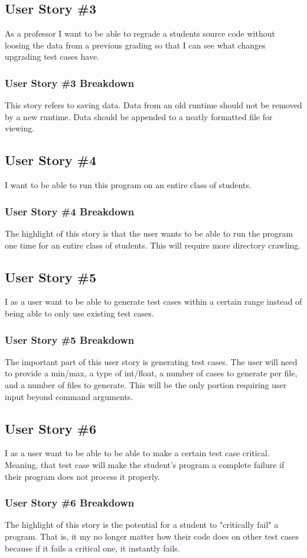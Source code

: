\subsection{User Story \#3} 

As a professor I want to be able to regrade a students source code without loosing the data from a previous
grading so that I can see what changes upgrading test cases have.

\subsubsection{User Story \#3 Breakdown}
This story refers to saving data. Data from an old runtime should not be removed by a new runtime. Data should be appended to a neatly formatted file for viewing.

\subsection{User Story \#4}
I want to be able to run this program on an entire class of students.

\subsubsection{User Story \#4 Breakdown}
The highlight of this story is that the user wants to be able to run the program one time for an entire class of students. This will require more directory crawling.

\subsection{User Story \#5}
I as a user want to be able to generate test cases within a certain range instead of being able to only use existing test cases.

\subsubsection{User Story \#5 Breakdown}
The important part of this user story is generating test cases. The user will need to provide a min/max, a type of int/float, a number of cases to generate per file, and a number of files to generate. This will be the only portion requiring user input beyond command arguments.

\subsection{User Story \#6}
I as a user want to be able to be able to make a certain test case critical. Meaning, that test case will make the student's program a complete failure if their program does not process it properly.

\subsubsection{User Story \#6 Breakdown}
The highlight of this story is the potential for a student to "critically fail" a program. That is, it my no longer matter how their code does on other test cases because if it fails a critical one, it instantly fails.

